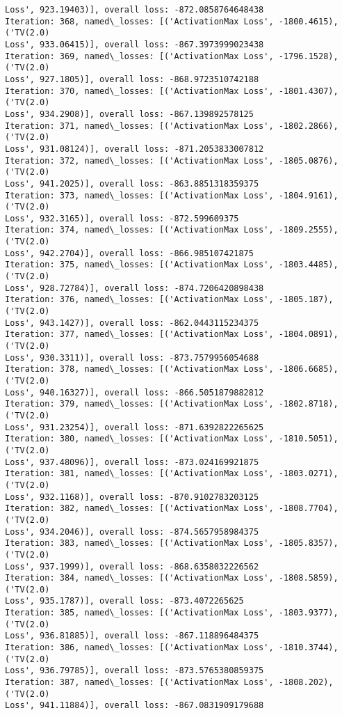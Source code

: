 \documentclass[10pt]{article}
\begin{document}
\begin{Verbatim}[commandchars=\\\{\}]
Loss', 923.19403)], overall loss: -872.0858764648438
Iteration: 368, named\_losses: [('ActivationMax Loss', -1800.4615), ('TV(2.0)
Loss', 933.06415)], overall loss: -867.3973999023438
Iteration: 369, named\_losses: [('ActivationMax Loss', -1796.1528), ('TV(2.0)
Loss', 927.1805)], overall loss: -868.9723510742188
Iteration: 370, named\_losses: [('ActivationMax Loss', -1801.4307), ('TV(2.0)
Loss', 934.2908)], overall loss: -867.139892578125
Iteration: 371, named\_losses: [('ActivationMax Loss', -1802.2866), ('TV(2.0)
Loss', 931.08124)], overall loss: -871.2053833007812
Iteration: 372, named\_losses: [('ActivationMax Loss', -1805.0876), ('TV(2.0)
Loss', 941.2025)], overall loss: -863.8851318359375
Iteration: 373, named\_losses: [('ActivationMax Loss', -1804.9161), ('TV(2.0)
Loss', 932.3165)], overall loss: -872.599609375
Iteration: 374, named\_losses: [('ActivationMax Loss', -1809.2555), ('TV(2.0)
Loss', 942.2704)], overall loss: -866.985107421875
Iteration: 375, named\_losses: [('ActivationMax Loss', -1803.4485), ('TV(2.0)
Loss', 928.72784)], overall loss: -874.7206420898438
Iteration: 376, named\_losses: [('ActivationMax Loss', -1805.187), ('TV(2.0)
Loss', 943.1427)], overall loss: -862.0443115234375
Iteration: 377, named\_losses: [('ActivationMax Loss', -1804.0891), ('TV(2.0)
Loss', 930.3311)], overall loss: -873.7579956054688
Iteration: 378, named\_losses: [('ActivationMax Loss', -1806.6685), ('TV(2.0)
Loss', 940.16327)], overall loss: -866.5051879882812
Iteration: 379, named\_losses: [('ActivationMax Loss', -1802.8718), ('TV(2.0)
Loss', 931.23254)], overall loss: -871.6392822265625
Iteration: 380, named\_losses: [('ActivationMax Loss', -1810.5051), ('TV(2.0)
Loss', 937.48096)], overall loss: -873.024169921875
Iteration: 381, named\_losses: [('ActivationMax Loss', -1803.0271), ('TV(2.0)
Loss', 932.1168)], overall loss: -870.9102783203125
Iteration: 382, named\_losses: [('ActivationMax Loss', -1808.7704), ('TV(2.0)
Loss', 934.2046)], overall loss: -874.5657958984375
Iteration: 383, named\_losses: [('ActivationMax Loss', -1805.8357), ('TV(2.0)
Loss', 937.1999)], overall loss: -868.6358032226562
Iteration: 384, named\_losses: [('ActivationMax Loss', -1808.5859), ('TV(2.0)
Loss', 935.1787)], overall loss: -873.4072265625
Iteration: 385, named\_losses: [('ActivationMax Loss', -1803.9377), ('TV(2.0)
Loss', 936.81885)], overall loss: -867.118896484375
Iteration: 386, named\_losses: [('ActivationMax Loss', -1810.3744), ('TV(2.0)
Loss', 936.79785)], overall loss: -873.5765380859375
Iteration: 387, named\_losses: [('ActivationMax Loss', -1808.202), ('TV(2.0)
Loss', 941.11884)], overall loss: -867.0831909179688

\end{Verbatim}
\end{document}
